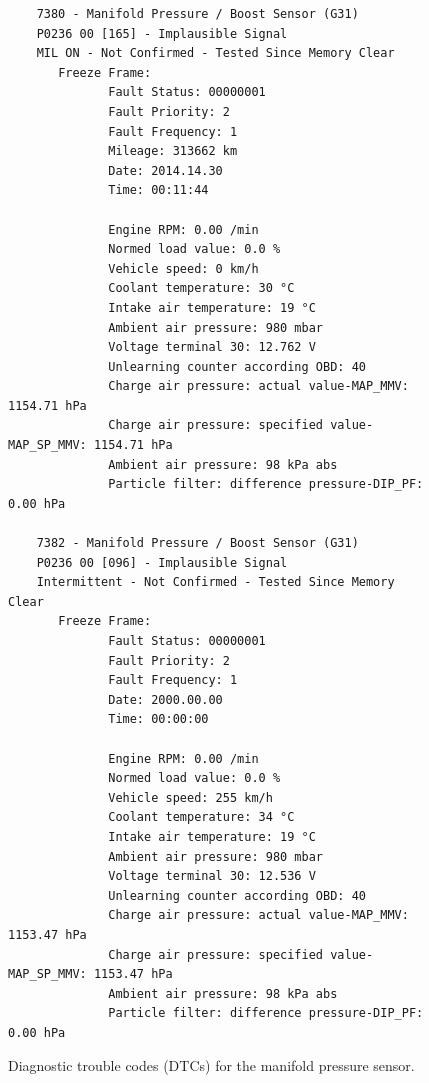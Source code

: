 \begin{figure}[ht]
\centering
\begin{lstlisting}
    7380 - Manifold Pressure / Boost Sensor (G31)
    P0236 00 [165] - Implausible Signal
    MIL ON - Not Confirmed - Tested Since Memory Clear
       Freeze Frame:
              Fault Status: 00000001
              Fault Priority: 2
              Fault Frequency: 1
              Mileage: 313662 km
              Date: 2014.14.30
              Time: 00:11:44
    
              Engine RPM: 0.00 /min
              Normed load value: 0.0 %
              Vehicle speed: 0 km/h
              Coolant temperature: 30 °C
              Intake air temperature: 19 °C
              Ambient air pressure: 980 mbar
              Voltage terminal 30: 12.762 V
              Unlearning counter according OBD: 40
              Charge air pressure: actual value-MAP_MMV: 1154.71 hPa
              Charge air pressure: specified value-MAP_SP_MMV: 1154.71 hPa
              Ambient air pressure: 98 kPa abs
              Particle filter: difference pressure-DIP_PF: 0.00 hPa
    
    7382 - Manifold Pressure / Boost Sensor (G31)
    P0236 00 [096] - Implausible Signal
    Intermittent - Not Confirmed - Tested Since Memory Clear
       Freeze Frame:
              Fault Status: 00000001
              Fault Priority: 2
              Fault Frequency: 1
              Date: 2000.00.00
              Time: 00:00:00
    
              Engine RPM: 0.00 /min
              Normed load value: 0.0 %
              Vehicle speed: 255 km/h
              Coolant temperature: 34 °C
              Intake air temperature: 19 °C
              Ambient air pressure: 980 mbar
              Voltage terminal 30: 12.536 V
              Unlearning counter according OBD: 40
              Charge air pressure: actual value-MAP_MMV: 1153.47 hPa
              Charge air pressure: specified value-MAP_SP_MMV: 1153.47 hPa
              Ambient air pressure: 98 kPa abs
              Particle filter: difference pressure-DIP_PF: 0.00 hPa
\end{lstlisting}
\caption{Diagnostic trouble codes (DTCs) for the manifold pressure sensor.}
\label{fig:dtc_codes}
\end{figure}

